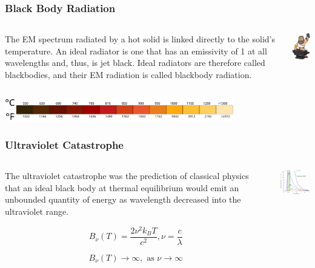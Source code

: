 \documentclass{beamer}
\begin{document}
\begin{frame}\frametitle{Black Body Radiation}
\begin{columns}
\begin{column}{7cm}
The EM spectrum radiated by a hot solid is linked directly to the solid’s temperature. An ideal radiator is one that has an emissivity of 1 at all wavelengths and, thus, is jet black. Ideal radiators are therefore called blackbodies, and their EM radiation is called blackbody radiation.
\end{column}
\begin{column}{4.5cm}
\begin{center}
\includegraphics[width=3cm]{fig/hephaestus.jpg}
\end{center}
\end{column}
\end{columns}

\begin{center}
\includegraphics[width=10cm]{fig/blacksmith.png}
\end{center}
\end{frame}


\begin{frame}\frametitle{Ultraviolet Catastrophe}
\begin{columns}
\begin{column}{7.2cm}

The ultraviolet catastrophe was the prediction of classical physics that an ideal black body at thermal equilibrium would emit an unbounded quantity of energy as wavelength decreased into the ultraviolet range.

\[ B_{\nu}(T) = \frac{2 \nu^2 k_B T}{c^2}, \nu = \frac{c}{\lambda}\]

\[B_{\nu}(T) \rightarrow \infty, \text{ as } \nu \rightarrow \infty\]

\end{column}
\begin{column}{4cm}
\begin{center}
\includegraphics[width=4cm]{fig/blackbody.jpg}
\end{center}
\end{column}
\end{columns}
\end{frame}
\end{document}

